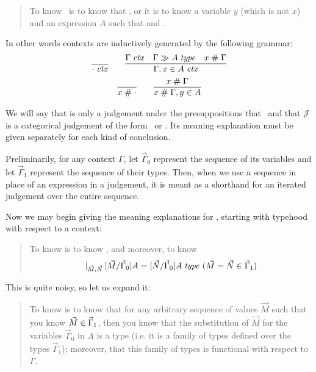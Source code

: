 \documentclass[main.tex]{subfiles}
\begin{document}
\begin{quote}
  To know \ is to know that \reduce{\Gamma}{\cdot}, or it is to know
  a variable $y$ (which is not $x$) and an expression $A$ such that 
  and .
\end{quote}

In other words contexts are inductively generated by the following grammar:
\begin{gather*}
  \infer{\isctx\cdot}{}
  \qquad
  \infer{
    \isctx{\Gamma,\ver{x}{A}}
  }{
    \isctx\Gamma &
    \sequent{\Gamma}{\isset{A}} &
    \fresh{x}{\Gamma}
  }\\
  \infer{\fresh{x}{\cdot}}{}
  \qquad
  \infer{
    \fresh{x}{\Gamma,\ver{y}{A}}
  }{
    \fresh{x}{\Gamma}
  }
\end{gather*}

We will say that  is only a judgement under the
presuppositions that \isctx\Gamma\ and that $\mathcal{J}$ is a categorical
judgement of the form \ or . Its meaning explanation must be
given separately for each kind of conclusion.

Preliminarily, for any context $\Gamma$, let $\vec\Gamma_0$ represent the
sequence of its variables and let $\vec\Gamma_1$ represent the sequence of
their types. Then, when we use a sequence in place of an expression in a
judgement, it is meant as a shorthand for an iterated judgement over the entire
sequence.

Now we may begin giving the meaning explanations for
, starting with typehood with respect to a context:

\begin{quote}
  To know  is to know
  ,
  and moreover, to know
  \[\lvert_{\vec{M},\vec{N}}\,[\vec{M}/\vec\Gamma_0]A =
  [\vec{N}/\vec\Gamma_0]A\;\mathit{type}\ (\vec{M}=\vec{N}\in\vec\Gamma_1)\]
\end{quote}

This is quite noisy, so let us expand it:

\begin{quote}
  To know  is to know that for any arbitrary sequence
  of values $\vec{M}$ such that you know $\vec{M}\in\vec\Gamma_1$, then
  you know that the substitution of $\vec{M}$ for the variables $\vec\Gamma_0$
  in $A$ is a type (i.e. it is a family of types defined over the types
  $\vec\Gamma_1$); moreover, that this family of types is functional with
  respect to $\Gamma$.
\end{quote}
\end{document}
